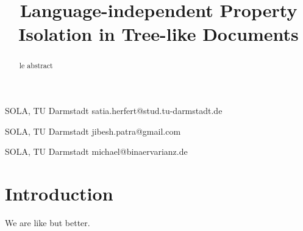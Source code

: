 \documentclass[numbers]{sigplanconf}
\begin{document}
\setlength{\pdfpageheight}{\paperheight}
\setlength{\pdfpagewidth}{\paperwidth}



\titlebanner{}        %

\title{Language-independent Property Isolation in Tree-like Documents}
\subtitle{}

           {SOLA, TU Darmstadt}
           {satia.herfert@stud.tu-darmstadt.de}
           
           {SOLA, TU Darmstadt}
           {jibesh.patra@gmail.com}
          
           {SOLA, TU Darmstadt}
           {michael@binaervarianz.de}

\maketitle

\begin{abstract}
le abstract
\end{abstract}




\section{Introduction}
\label{sec_introduction}

We are like \cite{hdd} but better.





\end{document}
